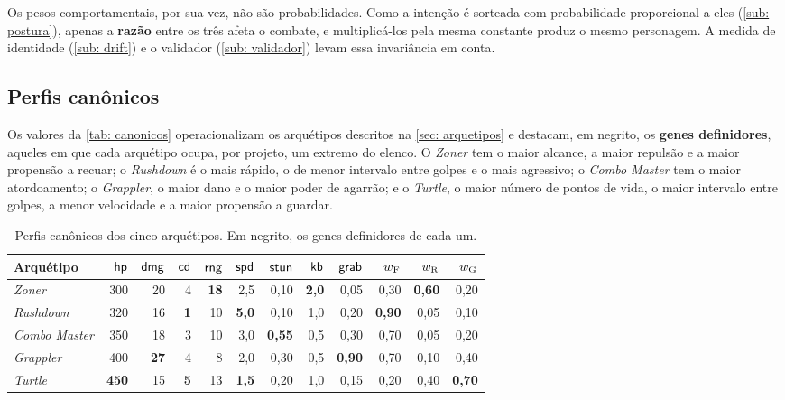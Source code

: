 Os pesos comportamentais, por sua vez, não são probabilidades. Como a intenção é sorteada com probabilidade proporcional a eles (\autoref{sub: postura}), apenas a \textbf{razão} entre os três afeta o combate, e multiplicá-los pela mesma constante produz o mesmo personagem. A medida de identidade (\autoref{sub: drift}) e o validador (\autoref{sub: validador}) levam essa invariância em conta.

\subsection{Perfis canônicos}
\label{sub: canonicos}

Os valores da \autoref{tab: canonicos} operacionalizam os arquétipos descritos na \autoref{sec: arquetipos} e destacam, em negrito, os \textbf{genes definidores}, aqueles em que cada arquétipo ocupa, por projeto, um extremo do elenco. O \textit{Zoner} tem o maior alcance, a maior repulsão e a maior propensão a recuar; o \textit{Rushdown} é o mais rápido, o de menor intervalo entre golpes e o mais agressivo; o \textit{Combo Master} tem o maior atordoamento; o \textit{Grappler}, o maior dano e o maior poder de agarrão; e o \textit{Turtle}, o maior número de pontos de vida, o maior intervalo entre golpes, a menor velocidade e a maior propensão a guardar.

\begin{table}[htb]
    \caption[Perfis canônicos dos cinco arquétipos]{Perfis canônicos dos cinco arquétipos. Em negrito, os genes definidores de cada um.}
    \label{tab: canonicos}
    \centering
    \footnotesize
    \setlength{\tabcolsep}{4pt}
    \begin{tabular}{l rrrrrrrr rrr}
        \toprule
        \textbf{Arquétipo} & $\mathsf{hp}$ & $\mathsf{dmg}$ & $\mathsf{cd}$ & $\mathsf{rng}$ & $\mathsf{spd}$ & $\mathsf{stun}$ & $\mathsf{kb}$ & $\mathsf{grab}$ & $w_{\mathrm{F}}$ & $w_{\mathrm{R}}$ & $w_{\mathrm{G}}$ \\
        \midrule
        \textit{Zoner}        & 300 & 20 & 4 & \textbf{18} & 2,5 & 0,10 & \textbf{2,0} & 0,05 & 0,30 & \textbf{0,60} & 0,20 \\
        \textit{Rushdown}     & 320 & 16 & \textbf{1} & 10 & \textbf{5,0} & 0,10 & 1,0 & 0,20 & \textbf{0,90} & 0,05 & 0,10 \\
        \textit{Combo Master} & 350 & 18 & 3 & 10 & 3,0 & \textbf{0,55} & 0,5 & 0,30 & 0,70 & 0,05 & 0,20 \\
        \textit{Grappler}     & 400 & \textbf{27} & 4 & 8 & 2,0 & 0,30 & 0,5 & \textbf{0,90} & 0,70 & 0,10 & 0,40 \\
        \textit{Turtle}       & \textbf{450} & 15 & \textbf{5} & 13 & \textbf{1,5} & 0,20 & 1,0 & 0,15 & 0,20 & 0,40 & \textbf{0,70} \\
        \bottomrule
    \end{tabular}
    \source
\end{table}

